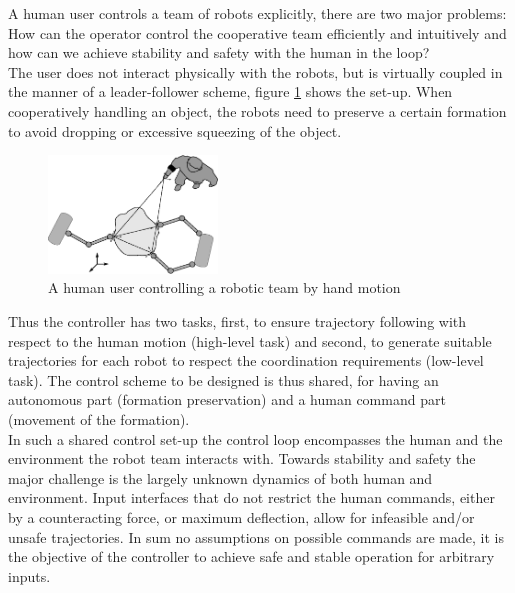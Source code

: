 \documentclass[a4paper,twoside, openright,12pt]{report}
\begin{document}
{A human user controls a team of robots explicitly, there are two major problems: How can the operator control the cooperative team efficiently and intuitively and how can we achieve stability and safety with the human in the loop?\\
The user does not interact physically with the robots, but is virtually coupled in the manner of a leader-follower scheme, figure \ref{FIG:ProblemOverview} shows the set-up. When cooperatively handling an object, the robots need to preserve a certain formation to avoid dropping or excessive squeezing of the object.
\begin{figure}[b]
			\centering
			\includegraphics[width=0.4\textwidth]{general_setup.eps}
			\caption{A human user controlling a robotic team by hand motion}
			\label{FIG:ProblemOverview}

\end{figure}
 Thus the controller has two tasks, first, to ensure trajectory following with respect to the human motion (high-level task) and second, to generate suitable trajectories for each robot to respect the coordination requirements (low-level task). The control scheme to be designed is thus shared, for having an autonomous part (formation preservation) and a human command part (movement of the formation).\\
 
In such a shared control set-up the control loop encompasses the human and the environment the robot team interacts with. 
Towards stability and safety the major challenge is the largely unknown dynamics of both human and environment.
Input interfaces that do not restrict the human commands, either by a counteracting force, or maximum deflection, allow for infeasible and/or unsafe trajectories. In sum no assumptions on possible commands are made, it is the objective of the controller to achieve safe and stable operation for arbitrary inputs.



}
\end{document}
